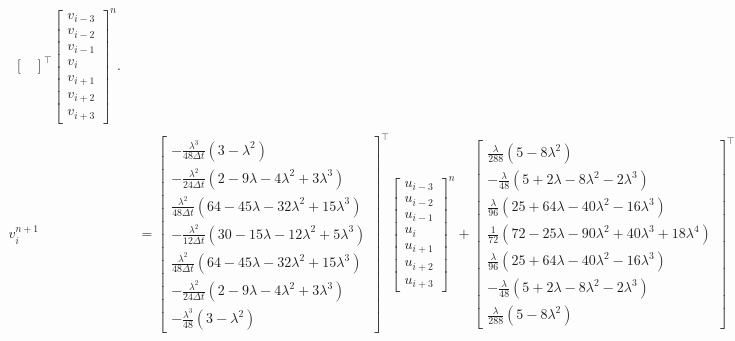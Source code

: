 \documentclass[12pt]{article}
\begin{document}
\begin{align}
\begin{aligned}
\begin{bmatrix}
\end{bmatrix}^\top
\begin{bmatrix}
v_{i-3} \\
v_{i-2} \\
v_{i-1} \\
v_i  \\
v_{i+1} \\
v_{i+2} \\
v_{i+3}
\end{bmatrix}^n.
\end{aligned}
\\
v_{i}^{n+1} &= 
\begin{bmatrix}
-\tfrac{\lambda^3}{48 \Delta t}(3 - \lambda^2) \\
-\tfrac{\lambda^2}{24 \Delta t} (2 - 9 \lambda - 4 \lambda^2 + 3 \lambda^3) \\
\tfrac{\lambda^2}{48 \Delta t} (64 - 45 \lambda - 32 \lambda^2 + 15 \lambda^3) \\
-\tfrac{\lambda^2}{12 \Delta t} (30 - 15 \lambda - 12 \lambda^2 + 5 \lambda^3) \\  
\tfrac{\lambda^2}{48 \Delta t} (64 - 45 \lambda - 32 \lambda^2 + 15 \lambda^3) \\
-\tfrac{\lambda^2}{24 \Delta t} (2 - 9 \lambda - 4 \lambda^2 + 3 \lambda^3) \\
-\tfrac{\lambda^3}{48}(3 - \lambda^2)
\end{bmatrix}^\top
\begin{bmatrix}
u_{i-3} \\
u_{i-2} \\
u_{i-1} \\
u_i  \\
u_{i+1} \\
u_{i+2} \\
u_{i+3}
\end{bmatrix}^n 
+
\begin{bmatrix}
\tfrac{\lambda}{288}(5 - 8 \lambda^2) \\
-\tfrac{\lambda}{48} (5 + 2 \lambda - 8 \lambda^2 - 2 \lambda^3) \\
\tfrac{\lambda}{96} (25 + 64 \lambda - 40 \lambda^2 - 16 \lambda^3) \\
\tfrac{1}{72} (72 - 25 \lambda - 90 \lambda^2 + 40 \lambda^3 + 18  \lambda^4) \\  
\tfrac{\lambda}{96} (25 + 64 \lambda - 40 \lambda^2 - 16 \lambda^3) \\
-\tfrac{\lambda}{48} (5 + 2 \lambda - 8 \lambda^2 - 2 \lambda^3) \\
\tfrac{\lambda}{288}(5 - 8 \lambda^2) 
\end{bmatrix}^\top
\begin{bmatrix}
v_{i-3} \\
v_{i-2} \\
v_{i-1} \\
v_i  \\
v_{i+1} \\
v_{i+2} \\
v_{i+3}
\end{bmatrix}^n. 
\end{align}
\end{document}
